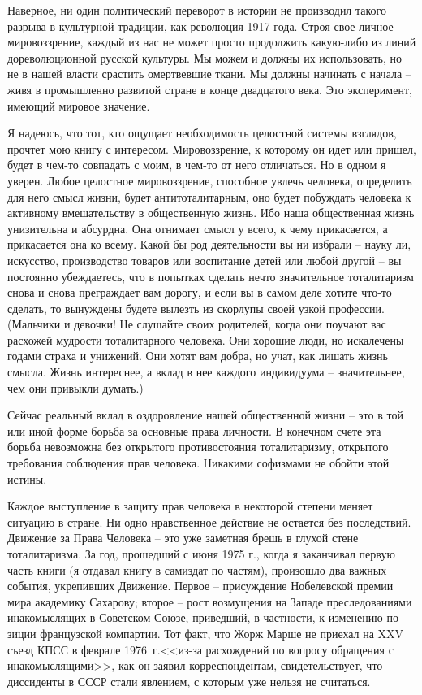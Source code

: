 \documentclass{book}
\begin{document}
Наверное, ни один политический переворот в истории не про­изводил такого разрыва в культурной традиции, как револю­ция 1917 года. Строя свое личное мировоззрение, каждый из нас не может просто продолжить какую-либо из линий дорево­люционной русской культуры. Мы можем и должны их исполь­зовать, но не в нашей власти срастить омертвевшие ткани. Мы должны начинать с начала -- живя в промышленно развитой стране в конце двадцатого века. Это эксперимент, имеющий ми­ровое значение.

Я надеюсь, что тот, кто ощущает необходимость целостной системы взглядов, прочтет мою книгу с интересом. Мировоз­зрение, к которому он идет или пришел, будет в чем-то совпа­дать с моим, в чем-то от него отличаться. Но в одном я уверен. Любое целостное мировоззрение, способное увлечь человека, определить для него смысл жизни, будет антитоталитарным, оно будет побуждать человека к активному вмешательству в общественную жизнь. Ибо наша общественная жизнь унизитель­на и абсурдна. Она отнимает смысл у всего, к чему прикасается, а прикасается она ко всему. Какой бы род деятельности вы ни избрали -- науку ли, искусство, производство товаров или вос­питание детей или любой другой -- вы постоянно убеждаетесь, что в попытках сделать нечто значительное тоталитаризм снова и снова преграждает вам дорогу, и если вы в самом деле хоти­те что-то сделать, то вынуждены будете вылезть из скорлупы своей узкой профессии. (Мальчики и девочки! Не слушайте сво­их родителей, когда они поучают вас расхожей мудрости тота­литарного 
человека. Они хорошие люди, но искалечены годами страха и унижений. Они хотят вам добра, но учат, как лишать жизнь смысла. Жизнь интереснее, а вклад в нее каждого инди­видуума -- значительнее, чем они привыкли думать.)

Сейчас реальный вклад в оздоровление нашей общественной жизни -- это в той или иной форме борьба за основные права личности. В конечном счете эта борьба невозможна без откры­того противостояния тоталитаризму, открытого требования соблюдения прав человека. Никакими софизмами не обойти этой истины.

Каждое выступление в защиту прав человека в некоторой степени меняет ситуацию в стране. Ни одно нравственное дейст­вие не остается без последствий. Движение за Права Человека -- это уже заметная брешь в глухой стене тоталитаризма. За год, прошедший с июня 1975 г., когда я заканчивал первую часть книги (я отдавал книгу в самиздат по частям), произошло два важных события, укрепивших Движение. Первое -- присужде­ние Нобелевской премии мира академику Сахарову; второе -- рост возмущения на Западе преследованиями инакомыслящих в Советском Союзе, приведший, в частности, к изменению по­зиции французской компартии. Тот факт, что Жорж Марше не приехал на XXV съезд КПСС в феврале 1976~г.<<из-за расхожде­ний по вопросу обращения с инакомыслящими>>, как он заявил корреспондентам, свидетельствует, что диссиденты в СССР стали явлением, с которым уже нельзя не считаться.
\end{document}
